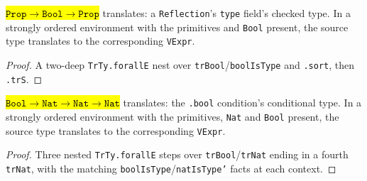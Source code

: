 \begin{lemma}
  \label{prim-cond:thm:trexprs-propboolprop}
  \leanok

   \hl{$\mathtt{Prop} \to \mathtt{Bool} \to \mathtt{Prop}$} translates: a
  \texttt{Reflection}'s \texttt{type} field's checked type.
  In a strongly ordered environment with the primitives and \texttt{Bool} present, the source type
  translates to the corresponding \texttt{VExpr}.
\end{lemma}
\begin{proof}
  \leanok
   A two-deep \texttt{TrTy.forallE} nest over \texttt{trBool}/\texttt{boolIsType} and
  \texttt{.sort}, then \texttt{.trS}.
\end{proof}

\begin{lemma}
  \label{prim-cond:thm:trexprs-boolnat3}
  \leanok

   \hl{$\mathtt{Bool} \to \mathtt{Nat} \to \mathtt{Nat} \to \mathtt{Nat}$}
  translates: the \texttt{.bool} condition's conditional type.
  In a strongly ordered environment with the primitives, \texttt{Nat} and \texttt{Bool} present,
  the source type translates to the corresponding \texttt{VExpr}.
\end{lemma}
\begin{proof}
  \leanok
   Three nested \texttt{TrTy.forallE} steps over \texttt{trBool}/\texttt{trNat} ending
  in a fourth \texttt{trNat}, with the matching \texttt{boolIsType}/\texttt{natIsType'} facts at
  each context.
\end{proof}


